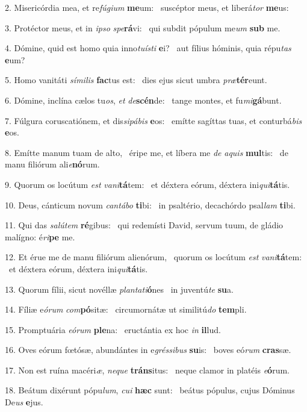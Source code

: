 2. Misericórdia mea, et re\textit{fú}\textit{gi}\textit{um} \textbf{me}um: \ast\  suscéptor meus, et liberá\textit{tor} \textbf{me}us:\

3. Protéctor meus, et in \textit{ip}\textit{so} \textit{spe}\textbf{rá}vi: \ast\  qui subdit pópulum me\textit{um} \textbf{sub} me.\

4. Dómine, quid est homo quia inno\textit{tu}\textit{ís}\textit{ti} \textbf{e}i? \ast\  aut fílius hóminis, quia répu\textit{tas} \textbf{e}um?\

5. Homo vanitáti \textit{sí}\textit{mi}\textit{lis} \textbf{fac}tus est: \ast\  dies ejus sicut umbra \textit{præ}\textbf{tér}eunt.\

6. Dómine, inclína cælos tu\textit{os}, \textit{et} \textit{de}\textbf{scén}de: \ast\  tange montes, et fu\textit{mi}\textbf{gá}bunt.\

7. Fúlgura coruscatiónem, et dis\textit{si}\textit{pá}\textit{bis} \textbf{e}os: \ast\  emítte sagíttas tuas, et conturbá\textit{bis} \textbf{e}os.\

8. Emítte manum tuam de alto, \dag\  éripe me, et líbera me \textit{de} \textit{a}\textit{quis} \textbf{mul}tis: \ast\  de manu filiórum ali\textit{e}\textbf{nó}rum.\

9. Quorum os locútum \textit{est} \textit{va}\textit{ni}\textbf{tá}tem: \ast\  et déxtera eórum, déxtera ini\textit{qui}\textbf{tá}tis.\

10. Deus, cánticum novum \textit{can}\textit{tá}\textit{bo} \textbf{ti}bi: \ast\  in psaltério, decachórdo psal\textit{lam} \textbf{ti}bi.\

11. Qui das \textit{sa}\textit{lú}\textit{tem} \textbf{ré}gibus: \ast\  qui redemísti David, servum tuum, de gládio malígno: é\textit{ri}\textbf{pe} me.\

12. Et érue me de manu filiórum alienórum, \dag\  quorum os locútum \textit{est} \textit{va}\textit{ni}\textbf{tá}tem: \ast\  et déxtera eórum, déxtera ini\textit{qui}\textbf{tá}tis.\

13. Quorum fílii, sicut novéllæ \textit{plan}\textit{ta}\textit{ti}\textbf{ó}nes \ast\  in juventú\textit{te} \textbf{su}a.\

14. Fíliæ e\textit{ó}\textit{rum} \textit{com}\textbf{pó}sitæ: \ast\  circumornátæ ut similitú\textit{do} \textbf{tem}pli.\

15. Promptuária \textit{e}\textit{ó}\textit{rum} \textbf{ple}na: \ast\  eructántia ex hoc \textit{in} \textbf{il}lud.\

16. Oves eórum fœtósæ, abundántes in e\textit{grés}\textit{si}\textit{bus} \textbf{su}is: \ast\  boves eó\textit{rum} \textbf{cras}sæ.\

17. Non est ruína macéri\textit{æ}, \textit{ne}\textit{que} \textbf{tráns}itus: \ast\  neque clamor in platéis \textit{e}\textbf{ó}rum.\

18. Beátum dixérunt pópu\textit{lum}, \textit{cu}\textit{i} \textbf{hæc} sunt: \ast\  beátus pópulus, cujus Dóminus De\textit{us} \textbf{e}jus.\

